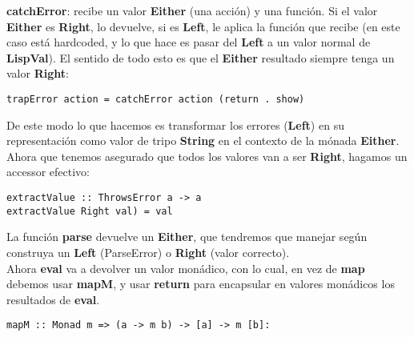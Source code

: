 \textbf{catchError}: recibe un valor \textbf{Either} (una acci\'on) y una funci\'on. Si el valor \textbf{Either} es \textbf{Right}, lo devuelve, si es \textbf{Left}, le aplica la funci\'on que recibe (en este caso est\'a hardcoded, y lo que hace es pasar del \textbf{Left} a un valor normal de \textbf{LispVal}). El sentido de todo esto es que el \textbf{Either} resultado siempre tenga un valor \textbf{Right}:\\

\begin{minipage}{\linewidth}
\begin{footnotesize}
\begin{lstlisting}[frame=single]
trapError action = catchError action (return . show)
\end{lstlisting}
\end{footnotesize}
\end{minipage}

De este modo lo que hacemos es transformar los errores (\textbf{Left}) en su representaci\'on como valor de tripo \textbf{String} en el contexto de la m\'onada \textbf{Either}.\\

Ahora que tenemos asegurado que todos los valores van a ser \textbf{Right}, hagamos un accessor
efectivo:\\

\begin{minipage}{\linewidth}
\begin{footnotesize}
\begin{lstlisting}[frame=single]
extractValue :: ThrowsError a -> a
extractValue Right val) = val
\end{lstlisting}
\end{footnotesize}
\end{minipage}

La funci\'on \textbf{parse} devuelve un \textbf{Either}, que tendremos que manejar seg\'un construya un \textbf{Left} (ParseError) o \textbf{Right} (valor correcto).\\

Ahora \textbf{eval} va a devolver un valor mon\'adico, con lo cual, en vez de \textbf{map} debemos usar \textbf{mapM}, y usar \textbf{return} para encapsular en valores mon\'adicos los resultados de \textbf{eval}.\\

\begin{minipage}{\linewidth}
\begin{footnotesize}
\begin{lstlisting}[frame=single]
mapM :: Monad m => (a -> m b) -> [a] -> m [b]:
\end{lstlisting}
\end{footnotesize}
\end{minipage}

